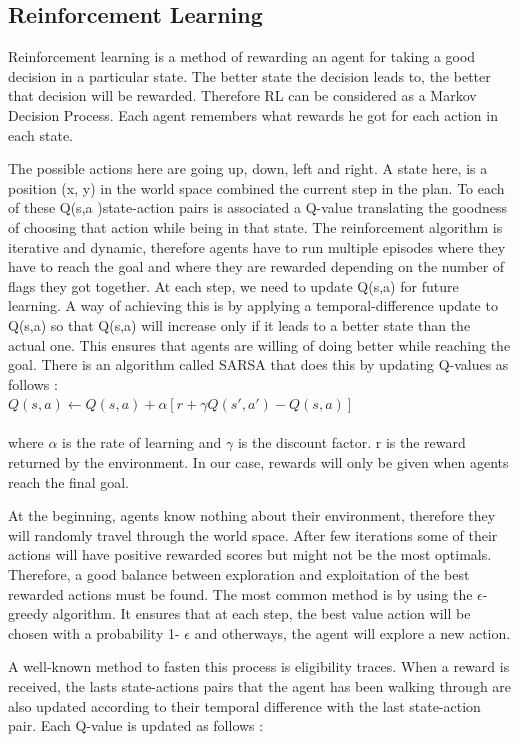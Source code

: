 \documentclass[letterpaper]{article}
\begin{document}
\subsection{Reinforcement Learning}
Reinforcement learning is a method of rewarding an agent for taking a good decision in a particular state. The better state the decision leads to, the better that decision will be rewarded. Therefore RL can be considered as a Markov Decision Process. Each agent remembers what rewards he got for each action in each state. 

The possible actions here are going up, down, left and right. A state here, is a position (x, y) in the world space combined the current step in the plan. To each of these Q(s,a )state-action pairs is associated a Q-value translating the goodness of choosing that action while being in that state. The reinforcement algorithm is iterative and dynamic, therefore agents have to run multiple episodes where they have to reach the goal and where they are rewarded depending on the number of flags they got together. At each step, we need to update Q(s,a)  for future learning. A way of achieving this is by applying a temporal-difference update to Q(s,a) so that Q(s,a) will increase only if it leads to a better state than the actual one. This ensures that agents are willing of doing better while reaching the goal. There is an algorithm called SARSA that does this by updating Q-values as follows : \\

$Q(s, a) \leftarrow  Q(s, a) +  \alpha [r + \gamma Q(s', a') - Q(s,a)]$\\\\
where $\alpha$ is the rate of learning and $\gamma$ is the discount factor. r is the reward returned by the environment. In our case, rewards will only be given when agents reach the final goal. 

At the beginning, agents know nothing about their environment, therefore they will randomly travel through the world space. After few iterations some of their actions will have positive rewarded scores but might not be the most optimals. Therefore, a good balance between exploration and exploitation of the best rewarded actions must be found. The most common method is by using the $\epsilon$-greedy algorithm. It ensures that at each step, the best value action will be chosen with a probability 1- $\epsilon$ and otherways, the agent will explore a new action.


A well-known method to fasten this process is eligibility traces. When a reward is received, the lasts state-actions pairs that the agent has been walking through are also updated according to their temporal difference with the last state-action pair. Each Q-value is updated as follows : \\
\end{document}
